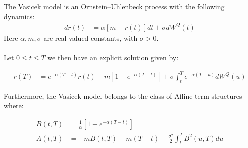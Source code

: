 \begin{proposition}
\label{prop: Vasicek_ATS}
The Vasicek model is an Ornstein–Uhlenbeck process with the following dynamics: 
\begin{align*}
dr(t) &= \alpha[m - r(t)]dt + \sigma dW^{Q}(t)    
\end{align*}
Here $\alpha, m, \sigma$ are real-valued constants, with $\sigma > 0$.
\\~\\
Let $0 \leq t \leq T$ we then have an explicit solution given by:

\begin{align*}
r(T) &= e^{-\alpha(T-t)}r(t) + m[1-e^{-\alpha(T-t)}] 
+ \sigma \int_{t}^{T}e^{-\alpha(T-u)}dW^{Q}(u)
\end{align*}

Furthermore, the Vasicek model belongs to the class of Affine term structures where: 

\begin{align*}
B(t,T) &= \frac{1}{\alpha}\left[1-e^{-\alpha(T-t)}\right] \\ 
A(t,T) &= -mB(t,T) - m(T-t) - \frac{\sigma^{2}}{2}\int_{t}^{T}B^{2}(u,T)du
\end{align*}
\end{proposition}




\newpage

